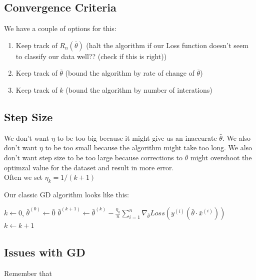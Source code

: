 \documentclass[12pt]{article}
\begin{document}
\subsection{Convergence Criteria}

We have a couple of options for this:

\begin{enumerate}
	\item Keep track of $R_n(\bar{\theta})$ (halt the algorithm if our Loss function doesn't seem to classify our data well?? (check if this is right))
	\item Keep track of $\bar{\theta}$ (bound the algorithm by rate of change of $\bar{\theta}$)
	\item Keep track of $k$ (bound the algorithm by number of interations)
\end{enumerate}

\subsection{Step Size}

We don't want $\eta$ to be too big because it might give us an inaccurate $\bar{\theta}$. We also don't want $\eta$ to be too small because the algorithm might take too long. We also don't want step size to be too large because corrections to $\bar{\theta}$ might overshoot the optimzal value for the dataset and result in more error.\\

Often we set $\eta_k = 1/(k+1)$

Our classic GD algorithm looks like this:

\begin{algorithm} \label{alg:GD}
	\caption{Linear Classification Using Gradient Descent}
	\begin{algorithmic}
		\State $k \gets 0$, $\bar{\theta}^{(0)} \gets \bar{0}$
		\State $\bar{\theta}^{(k+1)} \gets \bar{\theta}^{(k)} - \frac{\eta_k} {n} \sum_{i = 1}^n \nabla_{\bar{\theta}} Loss(y^{(i)}(\bar{\theta} \cdot \bar x^{(i)}))$
		\State $k \gets k + 1$
		\EndWhile
	\end{algorithmic}
\end{algorithm}

\subsection{Issues with GD}

Remember that 
\end{document}
